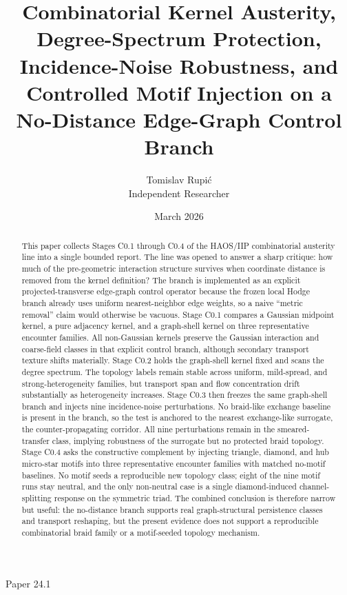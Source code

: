 \documentclass[11pt]{article}
\title{Combinatorial Kernel Austerity, Degree-Spectrum Protection, Incidence-Noise Robustness, and Controlled Motif Injection on a No-Distance Edge-Graph Control Branch}
\author{Tomislav Rupi\'c \\ Independent Researcher}
\date{March 2026}
\begin{document}
\maketitle
\begin{center}
\large Paper 24.1
\end{center}

\begin{abstract}
This paper collects Stages C0.1 through C0.4 of the HAOS/IIP combinatorial austerity line into a single bounded report. The line was opened to answer a sharp critique: how much of the pre-geometric interaction structure survives when coordinate distance is removed from the kernel definition? The branch is implemented as an explicit projected-transverse edge-graph control operator because the frozen local Hodge branch already uses uniform nearest-neighbor edge weights, so a naive ``metric removal'' claim would otherwise be vacuous. Stage C0.1 compares a Gaussian midpoint kernel, a pure adjacency kernel, and a graph-shell kernel on three representative encounter families. All non-Gaussian kernels preserve the Gaussian interaction and coarse-field classes in that explicit control branch, although secondary transport texture shifts materially. Stage C0.2 holds the graph-shell kernel fixed and scans the degree spectrum. The topology labels remain stable across uniform, mild-spread, and strong-heterogeneity families, but transport span and flow concentration drift substantially as heterogeneity increases. Stage C0.3 then freezes the same graph-shell branch and injects nine incidence-noise perturbations. No braid-like exchange baseline is present in the branch, so the test is anchored to the nearest exchange-like surrogate, the counter-propagating corridor. All nine perturbations remain in the smeared-transfer class, implying robustness of the surrogate but no protected braid topology. Stage C0.4 asks the constructive complement by injecting triangle, diamond, and hub micro-star motifs into three representative encounter families with matched no-motif baselines. No motif seeds a reproducible new topology class; eight of the nine motif runs stay neutral, and the only non-neutral case is a single diamond-induced channel-splitting response on the symmetric triad. The combined conclusion is therefore narrow but useful: the no-distance branch supports real graph-structural persistence classes and transport reshaping, but the present evidence does not support a reproducible combinatorial braid family or a motif-seeded topology mechanism.
\end{abstract}
\end{document}
